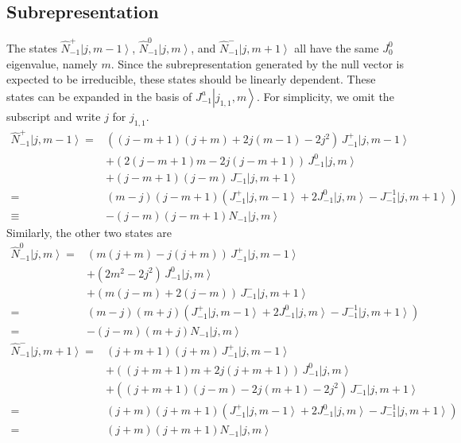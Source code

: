 \documentclass[10pt,a4paper]{article}
\numberwithin{equation}{section}
\newcommand{\ket}[1]{\left| #1 \right\rangle}
\begin{document}
\subsection{Subrepresentation}
The states $\hat{N}^{+}_{-1}\ket{j,m-1}$, $\hat{N}^{0}_{-1}\ket{j,m}$, and $\hat{N}^{-}_{-1} \ket{j,m+1}$ 
all have the same $J^{0}_{0}$ eigenvalue, namely $m$. Since the subrepresentation generated by the null vector is 
expected to be irreducible, these states should be linearly dependent. These states can be expanded in the basis of 
$J^{a}_{-1}\ket{j_{1,1},m}$. For simplicity, we omit the subscript and write $j$ for $j_{1,1}$.
\begin{equation}
    \begin{aligned}
        \hat{N}^{+}_{-1} \ket{j,m-1} = & ((j-m+1)(j+m) +2 j (m-1) -2 j^2) \, J^{+}_{-1}  \ket{j,m-1} \\
        & + (2(j-m+1)m-2j(j-m+1)) \, J^{0}_{-1}  \ket{j,m} \\
        & + (j-m+1)(j-m) \, J^{-}_{-1} \ket{j,m+1}\\
        = & (m-j)(j-m+1)\left( J^{+}_{-1} \ket{j,m-1} + 2 J^{0}_{-1} \ket{j,m} - J^{-1}_{-1} \ket{j,m+1} \right)\\
        \equiv  & -(j-m)(j-m+1) N_{-1} \ket{j,m}
    \end{aligned}
\end{equation}
Similarly, the other two states are 
\begin{equation}
    \begin{aligned}
        \hat{N}^{0}_{-1} \ket{j,m} = & (m(j+m) - j (j+m) ) \, J^{+}_{-1}  \ket{j,m-1} \\
        & + (2m^2 - 2j^2) \, J^{0}_{-1}  \ket{j,m} \\
        & + (m(j-m)+2(j-m)) \, J^{-}_{-1} \ket{j,m+1}\\
        = & (m-j)(m+j)\left( J^{+}_{-1} \ket{j,m-1} + 2 J^{0}_{-1} \ket{j,m} - J^{-1}_{-1} \ket{j,m+1} \right)\\
        = & -(j-m)(m+j) N_{-1} \ket{j,m}
    \end{aligned}
\end{equation}
\begin{equation}
    \begin{aligned}
        \hat{N}^{-}_{-1} \ket{j,m+1} = & (j+m+1)(j+m) \, J^{+}_{-1}  \ket{j,m-1} \\
        & + ((j+m+1)m+2j(j+m+1)) \, J^{0}_{-1}  \ket{j,m} \\
        & + ((j+m+1)(j-m)-2j(m+1)-2j^{2}) \, J^{-}_{-1} \ket{j,m+1}\\
        = & (j+m)(j+m+1)\left( J^{+}_{-1} \ket{j,m-1} + 2 J^{0}_{-1} \ket{j,m} - J^{-1}_{-1} \ket{j,m+1} \right)\\
        = & (j+m)(j+m+1) N_{-1} \ket{j,m}
    \end{aligned}
\end{equation}
\end{document}
